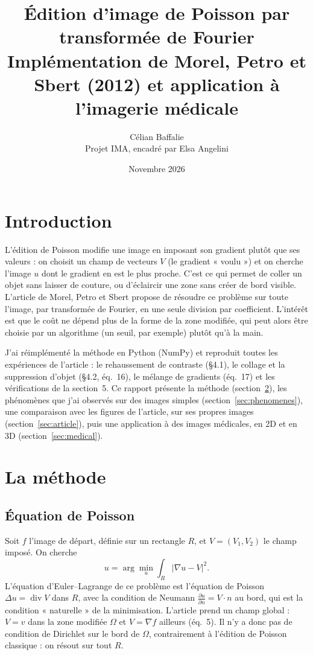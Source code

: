 \documentclass[11pt,a4paper]{article}
\title{Édition d'image de Poisson par transformée de Fourier\\[0.2em]
\large Implémentation de Morel, Petro et Sbert (2012) et application à l'imagerie médicale}
\author{Célian Baffalie\\ Projet IMA, encadré par Elsa Angelini}
\date{Novembre 2026}
\begin{document}
\maketitle

\section{Introduction}

L'édition de Poisson modifie une image en imposant son gradient plutôt que ses valeurs :
on choisit un champ de vecteurs $V$ (le gradient « voulu ») et on cherche l'image $u$ dont le gradient
en est le plus proche. C'est ce qui permet de coller un objet sans laisser de couture, ou d'éclaircir
une zone sans créer de bord visible. L'article de Morel, Petro et Sbert \cite{morel} propose de résoudre
ce problème sur toute l'image, par transformée de Fourier, en une seule division par coefficient.
L'intérêt est que le coût ne dépend plus de la forme de la zone modifiée, qui peut alors être choisie
par un algorithme (un seuil, par exemple) plutôt qu'à la main.

J'ai réimplémenté la méthode en Python (NumPy) et reproduit toutes les expériences de l'article :
le rehaussement de contraste (§4.1), le collage et la suppression d'objet (§4.2, éq.~16), le mélange de
gradients (éq.~17) et les vérifications de la section~5. Ce rapport présente la méthode
(section~\ref{sec:methode}), les phénomènes que j'ai observés sur des images simples
(section~\ref{sec:phenomenes}), une comparaison avec les figures de l'article, sur ses propres images
(section~\ref{sec:article}), puis une application à des images médicales, en 2D et en 3D
(section~\ref{sec:medical}).

\section{La méthode}\label{sec:methode}

\subsection{Équation de Poisson}

Soit $f$ l'image de départ, définie sur un rectangle $R$, et $V=(V_1,V_2)$ le champ imposé. On cherche
\[
  u = \arg\min_u \int_R \lvert \nabla u - V \rvert^2 .
\]
L'équation d'Euler--Lagrange de ce problème est l'équation de Poisson $\Delta u = \operatorname{div} V$
dans $R$, avec la condition de Neumann $\frac{\partial u}{\partial n} = V\cdot n$ au bord, qui est la
condition « naturelle » de la minimisation. L'article prend un champ global :
$V = v$ dans la zone modifiée $\Omega$ et $V = \nabla f$ ailleurs (éq.~5). Il n'y a donc pas de condition
de Dirichlet sur le bord de $\Omega$, contrairement à l'édition de Poisson classique : on résout sur tout $R$.
\end{document}
